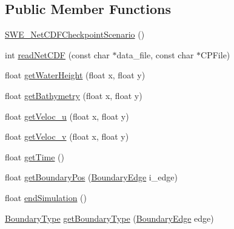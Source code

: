 \subsection*{Public Member Functions}
\begin{DoxyCompactItemize}
\item 
\hyperlink{classSWE__NetCDFCheckpointScenario_affda8845a2fb7b86de83b1dc37597973}{S\-W\-E\-\_\-\-Net\-C\-D\-F\-Checkpoint\-Scenario} ()
\item 
int \hyperlink{classSWE__NetCDFCheckpointScenario_aa9b5315744f1b3185b6222bbad311ea8}{read\-Net\-C\-D\-F} (const char $\ast$data\-\_\-file, const char $\ast$C\-P\-File)
\item 
float \hyperlink{classSWE__NetCDFCheckpointScenario_a15edd99b98b717cf20fe0336f7e55dc6}{get\-Water\-Height} (float x, float y)
\item 
float \hyperlink{classSWE__NetCDFCheckpointScenario_a8be504f26a1ba89e7c1e90e9e9901a4c}{get\-Bathymetry} (float x, float y)
\item 
float \hyperlink{classSWE__NetCDFCheckpointScenario_a18446d2b2d5763661c3dc64806151308}{get\-Veloc\-\_\-u} (float x, float y)
\item 
float \hyperlink{classSWE__NetCDFCheckpointScenario_a4a189381c6ee4747a7d04bd9f7de4cd9}{get\-Veloc\-\_\-v} (float x, float y)
\item 
float \hyperlink{classSWE__NetCDFCheckpointScenario_a7df5284c9391c296787d865f5abedd70}{get\-Time} ()
\item 
float \hyperlink{classSWE__NetCDFCheckpointScenario_ae5f905b453ee5f1d30276be57648e5b5}{get\-Boundary\-Pos} (\hyperlink{SWE__Scenario_8hh_aa5e01e3f7df312f7b9b0d02521141fcc}{Boundary\-Edge} i\-\_\-edge)
\item 
float \hyperlink{classSWE__NetCDFCheckpointScenario_ada5e3dde66e11532227e35f6104aa9bd}{end\-Simulation} ()
\item 
\hyperlink{SWE__Scenario_8hh_af75d5dd7322fa39ed0af4e7839e600f8}{Boundary\-Type} \hyperlink{classSWE__NetCDFCheckpointScenario_a5f4488ddce7c2dc4c14e4698c36881ae}{get\-Boundary\-Type} (\hyperlink{SWE__Scenario_8hh_aa5e01e3f7df312f7b9b0d02521141fcc}{Boundary\-Edge} edge)
\end{DoxyCompactItemize}


